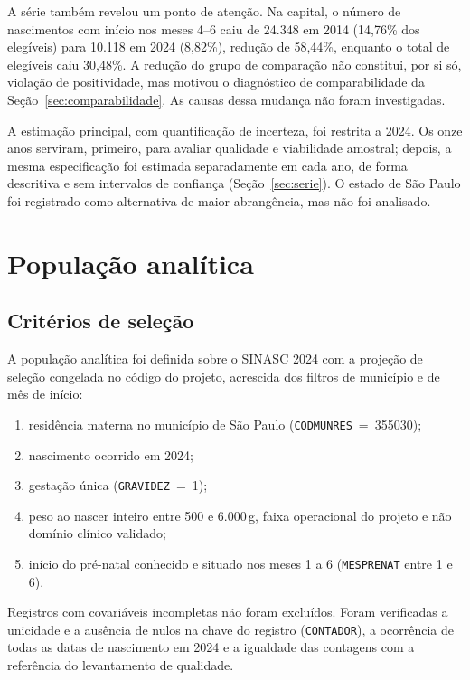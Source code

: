 \documentclass[11pt,a4paper]{article}
\newcommand{\campo}[1]{\texttt{#1}}       %
\begin{document}
A série também revelou um ponto de atenção. Na capital, o número de nascimentos com
início nos meses 4--6 caiu de 24.348 em 2014 (14,76\% dos elegíveis) para 10.118 em 2024
(8,82\%), redução de 58,44\%, enquanto o total de elegíveis caiu 30,48\%. A redução do
grupo de comparação não constitui, por si só, violação de positividade, mas motivou o
diagnóstico de comparabilidade da Seção~\ref{sec:comparabilidade}. As causas dessa
mudança não foram investigadas.

A estimação principal, com quantificação de incerteza, foi restrita a 2024. Os onze anos
serviram, primeiro, para avaliar qualidade e viabilidade amostral; depois, a mesma
especificação foi estimada separadamente em cada ano, de forma descritiva e sem intervalos
de confiança (Seção~\ref{sec:serie}). O estado de São Paulo foi registrado como
alternativa de maior abrangência, mas não foi analisado.

\section{População analítica}\label{sec:populacao}

\subsection{Critérios de seleção}

A população analítica foi definida sobre o SINASC 2024 com a projeção de seleção
congelada no código do projeto, acrescida dos filtros de município e de mês de início:

\begin{enumerate}
\item residência materna no município de São Paulo (\campo{CODMUNRES}~=~355030);
\item nascimento ocorrido em 2024;
\item gestação única (\campo{GRAVIDEZ}~=~1);
\item peso ao nascer inteiro entre 500 e 6.000\,g, faixa operacional do projeto e não
domínio clínico validado;
\item início do pré-natal conhecido e situado nos meses 1 a 6 (\campo{MESPRENAT} entre 1
e 6).
\end{enumerate}

Registros com covariáveis incompletas não foram excluídos. Foram verificadas a unicidade
e a ausência de nulos na chave do registro (\campo{CONTADOR}), a ocorrência de todas as
datas de nascimento em 2024 e a igualdade das contagens com a referência do levantamento
de qualidade.
\end{document}
